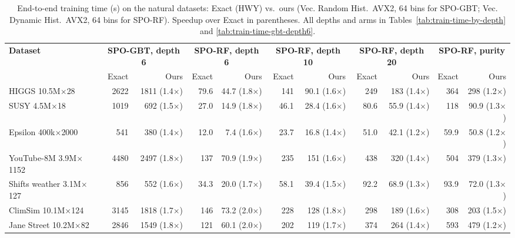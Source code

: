 \begin{table}[t]
    \centering
    \footnotesize
    \setlength{\tabcolsep}{3pt}
    \begin{tabular}{l|rr|rr|rr|rr|rr}
        \hline
        \multirow{2}{*}{\textbf{Dataset}} & \multicolumn{2}{c|}{\textbf{SPO-GBT, depth 6}} & \multicolumn{2}{c|}{\textbf{SPO-RF, depth 6}} & \multicolumn{2}{c|}{\textbf{SPO-RF, depth 10}} & \multicolumn{2}{c|}{\textbf{SPO-RF, depth 20}} & \multicolumn{2}{c}{\textbf{SPO-RF, purity}} \\
         & Exact & Ours & Exact & Ours & Exact & Ours & Exact & Ours & Exact & Ours \\
        \hline
        HIGGS 10.5M$\times$28 & 2622 & 1811 (1.4$\times$) & 79.6 & 44.7 (1.8$\times$) & 141 & 90.1 (1.6$\times$) & 249 & 183 (1.4$\times$) & 364 & 298 (1.2$\times$) \\
        SUSY 4.5M$\times$18 & 1019 & 692 (1.5$\times$) & 27.0 & 14.9 (1.8$\times$) & 46.1 & 28.4 (1.6$\times$) & 80.6 & 55.9 (1.4$\times$) & 118 & 90.9 (1.3$\times$) \\
        Epsilon 400k$\times$2000 & 541 & 380 (1.4$\times$) & 12.0 & 7.4 (1.6$\times$) & 23.7 & 16.8 (1.4$\times$) & 51.0 & 42.1 (1.2$\times$) & 59.9 & 50.8 (1.2$\times$) \\
        YouTube-8M 3.9M$\times$1152 & 4480 & 2497 (1.8$\times$) & 137 & 70.9 (1.9$\times$) & 235 & 151 (1.6$\times$) & 438 & 320 (1.4$\times$) & 504 & 379 (1.3$\times$) \\
        Shifts weather 3.1M$\times$127 & 856 & 552 (1.6$\times$) & 34.3 & 20.0 (1.7$\times$) & 58.1 & 39.4 (1.5$\times$) & 92.2 & 68.9 (1.3$\times$) & 93.9 & 72.0 (1.3$\times$) \\
        ClimSim 10.1M$\times$124 & 3145 & 1818 (1.7$\times$) & 146 & 73.2 (2.0$\times$) & 228 & 128 (1.8$\times$) & 298 & 189 (1.6$\times$) & 308 & 203 (1.5$\times$) \\
        Jane Street 10.2M$\times$82 & 2846 & 1549 (1.8$\times$) & 121 & 60.1 (2.0$\times$) & 202 & 119 (1.7$\times$) & 374 & 264 (1.4$\times$) & 593 & 479 (1.2$\times$) \\
        \hline
    \end{tabular}
    \caption{End-to-end training time (s) on the natural datasets: Exact (HWY) vs.\ ours (Vec. Random Hist.\ AVX2, 64 bins for SPO-GBT; Vec. Dynamic Hist.\ AVX2, 64 bins for SPO-RF). Speedup over Exact in parentheses. All depths and arms in Tables~\ref{tab:train-time-by-depth} and \ref{tab:train-time-gbt-depth6}.}
    \label{tab:train-time-natural}
\end{table}
